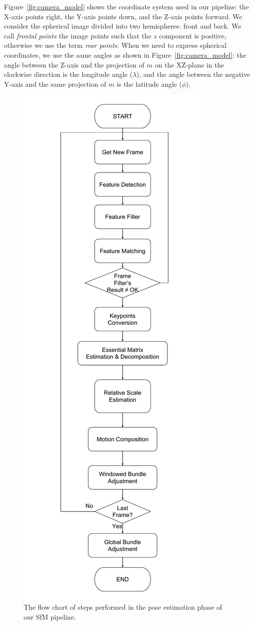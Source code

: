 Figure~\ref{fig:camera_model} shows the coordinate system used in our pipeline: the X-axis points right, the Y-axis points down, and the Z-axis points forward. We consider the spherical image divided into two hemispheres: front and back. We call \textit{frontal points} the image points such that the $z$ component is positive, otherwise we use the term \textit{rear points}.
When we need to express spherical coordinates, we use the same angles as shown in 
Figure~\ref{fig:camera_model}:
the angle between the Z-axis and the projection of $m$ on the XZ-plane in 
the clockwise direction is the longitude angle ($\lambda$), and the angle 
between the negative Y-axis and the same projection of $m$ is the latitude 
angle ($\phi$).
%
\begin{figure}
	\centering
	\includegraphics[width=0.5\linewidth]{img/sfm_fc.pdf}
	\caption{The flow chart of steps performed in the pose estimation 
	phase of our SfM pipeline.}
	\label{fig:sfm_block}
\end{figure}


